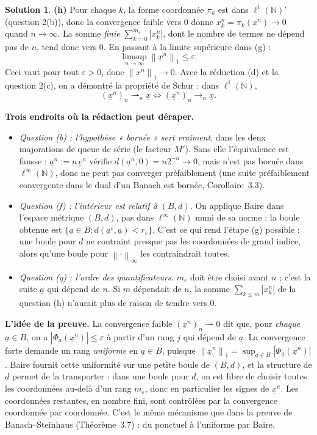 \documentclass[11pt,a4paper]{article}
\newcommand{\N}{\mathbb{N}}
\newcommand{\norm}[1]{\left\|#1\right\|}
\newcommand{\wk}{\rightharpoonup}
\theoremstyle{definition}
\newtheorem*{solution}{Solution}
\newcommand{\su}[1]{\underline{#1}}
\newcommand{\linf}{\ell^\infty(\N)}
\newcommand{\lun}{\ell^1(\N)}
\begin{document}
\begin{solution}
\medskip
\noindent\textbf{(h)} Pour chaque $k$, la forme coordonnée $\pi_k$ est dans $\lun'$ (question 2(b)), donc la convergence faible vers $0$ donne $x^n_k=\pi_k(\su x^n)\to0$ quand $n\to\infty$. La somme \emph{finie} $\sum_{k=0}^{m_\varepsilon}|x^n_k|$, dont le nombre de termes ne dépend pas de $n$, tend donc vers $0$. En passant à la limite supérieure dans (g) :
\[
  \limsup_{n\to\infty}\norm{\su x^n}_1\le\varepsilon .
\]
Ceci vaut pour tout $\varepsilon>0$, donc $\norm{\su x^n}_1\to0$. Avec la réduction (d) et la question 2(c), on a démontré la propriété de Schur : dans $\lun$,
\[
  (\su x^n)_n\wk_n\su x\iff(\su x^n)_n\to_n\su x .
\]
\end{solution}

\begin{piege}
\textbf{Trois endroits où la rédaction peut déraper.}
\begin{itemize}[leftmargin=*]
  \item \emph{Question (b) : l'hypothèse « bornée » sert vraiment}, dans les deux majorations de queue de série (le facteur $M'$). Sans elle l'équivalence est fausse : $\su a^n:=n\,\su e^n$ vérifie $d(\su a^n,0)=n2^{-n}\to0$, mais n'est pas bornée dans $\linf$, donc ne peut pas converger préfaiblement (une suite préfaiblement convergente dans le dual d'un Banach est bornée, Corollaire~3.3).
  \item \emph{Question (f) : l'intérieur est relatif à $(B,d)$.} On applique Baire dans l'espace métrique $(B,d)$, pas dans $\linf$ muni de sa norme ; la boule obtenue est $\{\su a\in B:d(\su a^\varepsilon,\su a)<r_\varepsilon\}$. C'est ce qui rend l'étape (g) possible : une boule pour $d$ ne contraint presque pas les coordonnées de grand indice, alors qu'une boule pour $\norm\cdot_\infty$ les contraindrait toutes.
  \item \emph{Question (g) : l'ordre des quantificateurs.} $m_\varepsilon$ doit être choisi avant $n$ ; c'est la suite $\su a$ qui dépend de $n$. Si $m$ dépendait de $n$, la somme $\sum_{k\le m}|x^n_k|$ de la question (h) n'aurait plus de raison de tendre vers $0$.
\end{itemize}
\end{piege}

\begin{pointcle}
\textbf{L'idée de la preuve.} La convergence faible $(\su x^n)_n\wk0$ dit que, pour \emph{chaque} $\su a\in B$, on a $|\Phi_{\su a}(\su x^n)|\le\varepsilon$ à partir d'un rang $j$ qui dépend de $\su a$. La convergence forte demande un rang \emph{uniforme} en $\su a\in B$, puisque $\norm{\su x^n}_1=\sup_{\su a\in B}|\Phi_{\su a}(\su x^n)|$. Baire fournit cette uniformité sur une petite boule de $(B,d)$, et la structure de $d$ permet de la transporter : dans une boule pour $d$, on est libre de choisir toutes les coordonnées au-delà d'un rang $m_\varepsilon$, donc en particulier les signes de $\su x^n$. Les coordonnées restantes, en nombre fini, sont contrôlées par la convergence coordonnée par coordonnée. C'est le même mécanisme que dans la preuve de Banach--Steinhaus (Théorème~3.7) : du ponctuel à l'uniforme par Baire.
\end{pointcle}
\end{document}
